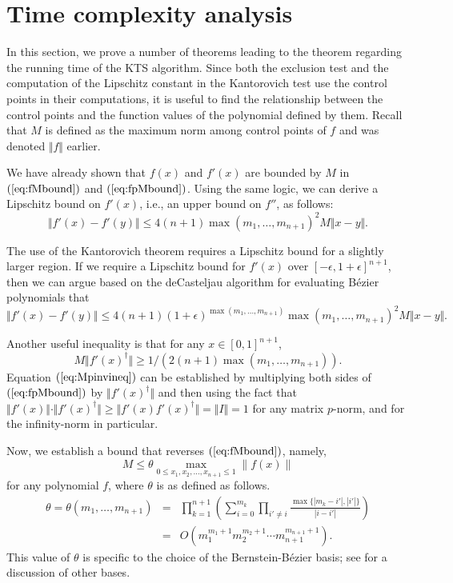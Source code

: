 \documentclass{article}
\newcommand{\norm}[1]{\left\|#1\right\|} \newcommand{\norma}[1]{\left\|#1\right\|}   \newcommand{\inv}[1]{#1^{-1}}
\newcommand{\mpinv}[1]{#1^{\dagger}}  \newcommand\eps{\epsilon}
\newcommand\eref[1]{$(\ref{#1})$}
\begin{document}
\section{Time complexity analysis}
\label{section_analysis}

In this section, we prove a number of theorems leading to the
theorem regarding the running time of the KTS algorithm. Since
both the exclusion test and the computation of the Lipschitz
constant in the Kantorovich test use the control points in their
computations, it is useful to find the relationship between the
control points and the function values of the polynomial defined
by them. Recall that $M$ is defined as the maximum norm among
control points of $f$ and was denoted $\Vert f\Vert$ earlier.

We have already shown that $f(x)$ and $f'(x)$ are bounded
by $M$ in 
\eref{eq:fMbound} and \eref{eq:fpMbound}.
Using the same logic, we can derive
a Lipschitz bound on $f'(x)$, i.e., an upper bound on
$f''$, as follows:
\begin{equation}
\Vert f'(x)-f'(y)\Vert \le 4(n+1)\max(m_1,\ldots,m_{n+1})^2M\Vert x-y\Vert.
\label{eq:fLipMbound}
\end{equation}

The use of the Kantorovich theorem requires a Lipschitz bound
for a slightly larger region.  If we require a Lipschitz bound for
$f'(x)$ over $[-\eps,1+\eps]^{n+1}$, then we can argue based on the
deCasteljau algorithm for evaluating B\'ezier polynomials that
\begin{equation}
  \Vert f'(x)-f'(y)\Vert \le 4(n+1)(1+\eps)^{\max(m_1,\ldots,m_{n+1})}\max(m_1,\ldots,m_{n+1})^2M\Vert x-y\Vert.
\label{eq:exLip}
\end{equation}

Another useful inequality is that for any $x\in[0,1]^{n+1}$,
\begin{equation}
M\Vert \mpinv{f'(x)}\Vert \ge 1/\left(2(n+1)\max(m_1, \ldots, m_{n+1})\right).
\label{eq:Mpinvineq}
\end{equation}
Equation \eref{eq:Mpinvineq} can be established
by multiplying both sides of \eref{eq:fpMbound}
by  $\Vert \mpinv{f'(x)}\Vert$ and then using
the fact that
$\Vert f'(x)\Vert\cdot \Vert \mpinv{f'(x)}\Vert\ge
\Vert  f'(x)\mpinv{f'(x)}\Vert =\Vert I\Vert=1$ for any
matrix $p$-norm, and for the infinity-norm in particular.


Now, we establish a bound that reverses \eref{eq:fMbound},
namely,
\begin{equation}
\label{theta_eq} M \leq \theta \max_{0 \leq
x_1,x_2,\ldots,x_{n+1} \leq 1} \norm{f(x)}
\end{equation}
for any polynomial $f$, where $\theta$ is as
defined as follows.
\begin{eqnarray}
\label{theta_def} \theta = \theta(m_1,\ldots, m_{n+1}) & = &
\prod_{k=1}^{n+1}\left(\sum_{i=0}^{m_k} \prod_{i' \neq i} \frac{\max\{|m_k-i'|,|i'|
\}}{|i-i'|} \right) \nonumber \\
&  = & O\left(m_1^{m_1+1}m_2^{m_2+1}\cdots m_{n+1}^{m_{n+1}+1}\right). \nonumber
\end{eqnarray}
This value of $\theta$  is specific to the choice of the
Bernstein-B\'ezier
basis; see \cite{srijuntongsiri_basis} for a discussion of other bases.
\end{document}
